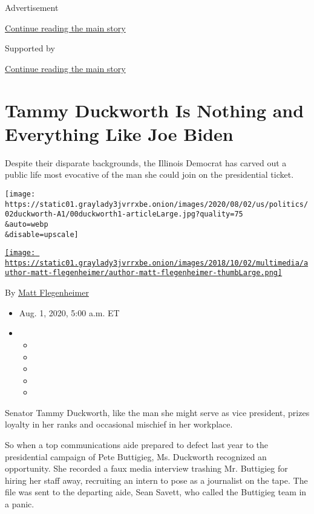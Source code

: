 Advertisement

\protect\hyperlink{after-top}{Continue reading the main story}

Supported by

\protect\hyperlink{after-sponsor}{Continue reading the main story}

\hypertarget{tammy-duckworth-is-nothing-and-everything-like-joe-biden}{%
\section{Tammy Duckworth Is Nothing and Everything Like Joe
Biden}\label{tammy-duckworth-is-nothing-and-everything-like-joe-biden}}

Despite their disparate backgrounds, the Illinois Democrat has carved
out a public life most evocative of the man she could join on the
presidential ticket.

\texttt{[image: https://static01.graylady3jvrrxbe.onion/images/2020/08/02/us/politics/02duckworth-A1/00duckworth1-articleLarge.jpg?quality=75\\\&auto=webp\\\&disable=upscale]}

\href{https://www.nytimes3xbfgragh.onion/by/matt-flegenheimer}{\texttt{[image: https://static01.graylady3jvrrxbe.onion/images/2018/10/02/multimedia/author-matt-flegenheimer/author-matt-flegenheimer-thumbLarge.png]}}

By \href{https://www.nytimes3xbfgragh.onion/by/matt-flegenheimer}{Matt
Flegenheimer}

\begin{itemize}
\item
  Aug. 1, 2020, 5:00 a.m. ET
\item
  \begin{itemize}
  \item
  \item
  \item
  \item
  \item
  \end{itemize}
\end{itemize}

Senator Tammy Duckworth, like the man she might serve as vice president,
prizes loyalty in her ranks and occasional mischief in her workplace.

So when a top communications aide prepared to defect last year to the
presidential campaign of Pete Buttigieg, Ms. Duckworth recognized an
opportunity. She recorded a faux media interview trashing Mr. Buttigieg
for hiring her staff away, recruiting an intern to pose as a journalist
on the tape. The file was sent to the departing aide, Sean Savett, who
called the Buttigieg team in a panic.

